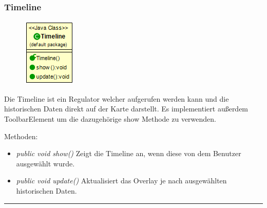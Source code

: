 \subsubsection{Timeline}
\begin{minipage}{0.3\textwidth}
    \begin{figure}[H]
        {\centering\includegraphics[scale = 0.7
        ]{media/view/toolbar/Timeline_Class.png}}
    \end{figure}
    \end{minipage} \hfill
    \begin{minipage}{0.6\textwidth}
Die Timeline ist ein Regulator welcher aufgerufen werden kann und die historischen Daten direkt auf der Karte darstellt. Es implementiert außerdem ToolbarElement um die dazugehörige show Methode zu verwenden.
\end{minipage}
\vspace{\baselineskip}
Methoden: \begin{itemize} [noitemsep]
    \item \emph{public void show()} Zeigt die Timeline an, wenn diese von dem Benutzer ausgewählt wurde.
    \item \emph{public void update()} Aktualisiert das Overlay je nach ausgewählten historischen Daten.
\end{itemize}

\rule{\textwidth}{0.4pt}

